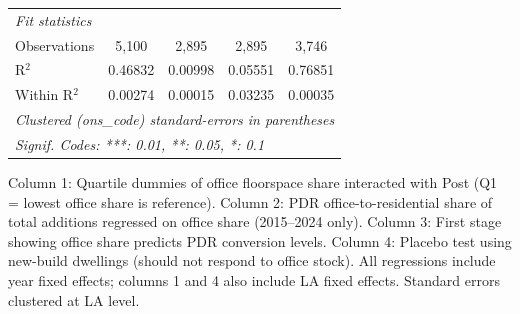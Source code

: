 \begin{table}[htbp]
\begin{tabular}{lcccc}
      \emph{Fit statistics}\\
      Observations                & 5,100               & 2,895            & 2,895         & 3,746\\  
      R$^2$                       & 0.46832             & 0.00998          & 0.05551       & 0.76851\\  
      Within R$^2$                & 0.00274             & 0.00015          & 0.03235       & 0.00035\\  
      \midrule \midrule
      \multicolumn{5}{l}{\emph{Clustered (ons\_code) standard-errors in parentheses}}\\
      \multicolumn{5}{l}{\emph{Signif. Codes: ***: 0.01, **: 0.05, *: 0.1}}\\
   \end{tabular}
   
   \par \raggedright 
   Column 1: Quartile dummies of office floorspace share interacted with Post (Q1 = lowest office share is reference). Column 2: PDR office-to-residential share of total additions regressed on office share (2015--2024 only). Column 3: First stage showing office share predicts PDR conversion levels. Column 4: Placebo test using new-build dwellings (should not respond to office stock). All regressions include year fixed effects; columns 1 and 4 also include LA fixed effects. Standard errors clustered at LA level.
\end{table}


